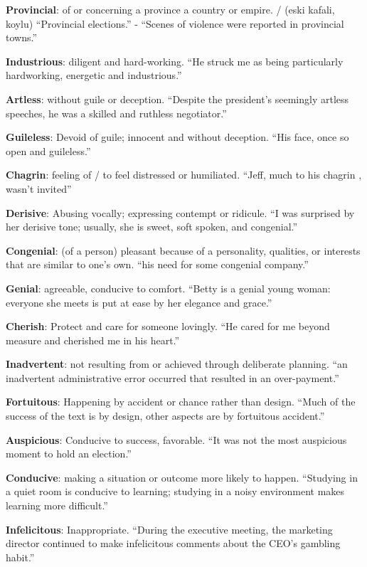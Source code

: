 \documentclass[12pt, a4paper]{ximera}
\begin{document}
\textbf{Provincial}: of or concerning a province a country or empire. / (eski kafali, koylu) ``Provincial elections.'' - ``Scenes of violence were reported in provincial towns.''

\textbf{Industrious}: diligent and hard-working. ``He struck me as being particularly hardworking, energetic and industrious.''

\textbf{Artless}: without guile or deception. ``Despite the president's seemingly artless speeches, he was a skilled and ruthless negotiator.''

\textbf{Guileless}: Devoid of guile; innocent and without deception. ``His face, once so open and guileless.''

\textbf{Chagrin}: feeling of / to feel distressed or humiliated. ``Jeff, much to his chagrin , wasn't invited''

\textbf{Derisive}: Abusing vocally; expressing contempt or ridicule. ``I was surprised by her derisive tone; usually, she is sweet, soft spoken, and congenial.''

\textbf{Congenial}: (of a person) pleasant because of a personality, qualities, or interests that are similar to one's own. ``his need for some congenial company.''

\textbf{Genial}: agreeable, conducive to comfort. ``Betty is a genial young woman: everyone she meets is put at ease by her elegance and grace.''

\textbf{Cherish}: Protect and care for someone lovingly. ``He cared for me beyond measure and cherished me in his heart.''

\textbf{Inadvertent}: not resulting from or achieved through deliberate planning. ``an inadvertent administrative error occurred that resulted in an over-payment.''

\textbf{Fortuitous}: Happening by accident or chance rather than design. ``Much of the success of the text is by design, other aspects are by fortuitous accident.''

\textbf{Auspicious}: Conducive to success, favorable. ``It was not the most auspicious moment to hold an election.''

\textbf{Conducive}: making a situation or outcome more likely to happen. ``Studying in a quiet room is conducive to learning; studying in a noisy environment makes learning more difficult.''

\textbf{Infelicitous}: Inappropriate. ``During the executive meeting, the marketing director continued to make infelicitous comments about the CEO's gambling habit.''
\end{document}
